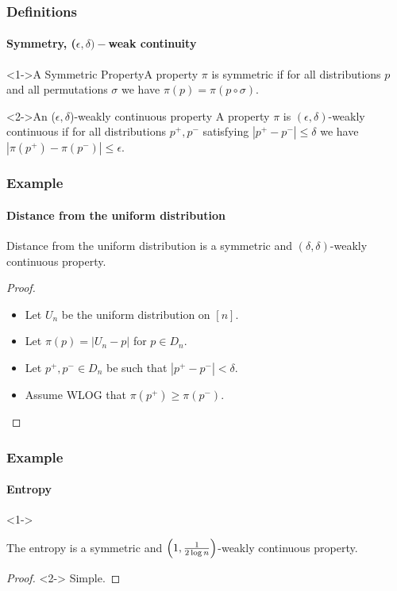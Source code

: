\documentclass{beamer}
\begin{document}
\begin{frame}
  \frametitle{Definitions}
  \framesubtitle{Symmetry, ($\epsilon,\delta)-$weak continuity}

  \begin{block}<1->{A Symmetric Property}A property $\pi$ is symmetric if
    for all distributions $p$ and all permutations $\sigma$ we have
    $\pi(p)=\pi(p\circ\sigma)$.
  \end{block}

  \begin{block}<2->{An ($\epsilon, \delta$)-weakly continuous property}
    A property $\pi$ is $(\epsilon,\delta)$-weakly continuous if for
    all distributions $p^+,p^-$ satisfying $|p^+-p^-|\le\delta$ we
    have $|\pi(p^+)-\pi(p^-)|\le \epsilon$.
  \end{block}

\end{frame}

\begin{frame}
  \frametitle{Example} \framesubtitle{Distance from the uniform
    distribution}
  \begin{theorem}
    Distance from the uniform distribution is a symmetric and
    $(\delta, \delta)$-weakly continuous property.
  \end{theorem}
  \begin{proof}
    \begin{itemize}
    \item<1-> Let $U_n$ be the uniform distribution on $[n]$.
    \item<2-> Let $\pi(p)=|U_n-p|$ for $p\in D_n$.
    \item<3-> Let $p^+,p^-\in D_n$ be such that $|p^+-p^-|<\delta$.
    \item<4-> Assume WLOG that $\pi(p^+) \geq \pi(p^-)$.
    \end{itemize}
  \end{proof}
\end{frame}

\begin{frame}
  \frametitle{Example} \framesubtitle{Entropy}
  \begin{theorem}<1->

    The entropy is a symmetric and $\left(1,{1\over 2\log
        n}\right)$-weakly continuous property.
  \end{theorem}
  \begin{proof}<2->
    Simple.
  \end{proof}
\end{frame}
\end{document}
